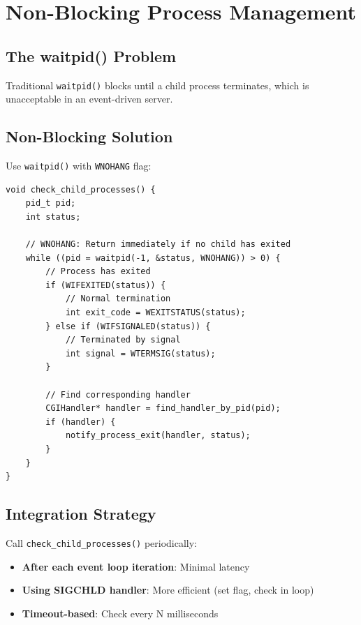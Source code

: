 \documentclass[12pt,a4paper]{article}
\begin{document}
\section{Non-Blocking Process Management}

\subsection{The waitpid() Problem}

Traditional \texttt{waitpid()} blocks until a child process terminates, which is unacceptable in an event-driven server.

\subsection{Non-Blocking Solution}

Use \texttt{waitpid()} with \texttt{WNOHANG} flag:

\begin{lstlisting}[caption=Non-Blocking Process Monitoring]
void check_child_processes() {
    pid_t pid;
    int status;
    
    // WNOHANG: Return immediately if no child has exited
    while ((pid = waitpid(-1, &status, WNOHANG)) > 0) {
        // Process has exited
        if (WIFEXITED(status)) {
            // Normal termination
            int exit_code = WEXITSTATUS(status);
        } else if (WIFSIGNALED(status)) {
            // Terminated by signal
            int signal = WTERMSIG(status);
        }
        
        // Find corresponding handler
        CGIHandler* handler = find_handler_by_pid(pid);
        if (handler) {
            notify_process_exit(handler, status);
        }
    }
}
\end{lstlisting}

\subsection{Integration Strategy}

Call \texttt{check\_child\_processes()} periodically:
\begin{itemize}
    \item \textbf{After each event loop iteration}: Minimal latency
    \item \textbf{Using SIGCHLD handler}: More efficient (set flag, check in loop)
    \item \textbf{Timeout-based}: Check every N milliseconds
\end{itemize}
\end{document}
